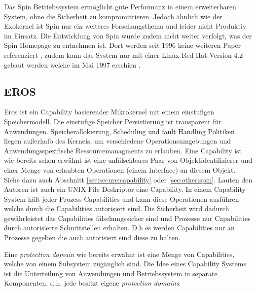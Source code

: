 \documentclass[11pt,technote]{IEEEtran}
\begin{document}
      Das Spin Betriebssystem erm\"oglicht gute Performanz in einem erweiterbaren System, ohne die Sicherheit zu kompromittieren.
      Jedoch \"ahnlich wie der Exokernel ist Spin nur ein weiteres Forschungsthema und leider nicht Produktiv im Einsatz.
      Die Entwicklung von Spin wurde zudem nicht weiter verfolgt, was der Spin Homepage zu entnehmen ist.
      Dort werden seit 1996 keine weiteren Paper referenziert \cite{Url:spin:papers}, zudem kann das System nur mit einer Linux Red Hat Version 4.2 
      gebaut werden welche im Mai 1997 erschien \cite{Url:spin:distro}.
      
    \subsection{EROS}      
      Eros ist ein Capability basierender Mikrokernel mit einem einstufigen Speichermodell. 
      Die einstufige Speicher Persistierung ist transparent f\"ur Anwendungen. Speicherallokierung, Scheduling und fault Handling Politiken 
      liegen au\ss erhalb des Kernels, um verschiedene Operationsumgebungen und Anwendungsspezifische Ressourcemanagments zu erlauben.
      Eine Capability ist wie bereits schon erw\"ahnt ist eine unf\"alschbares Paar von Objektidentifizierer und einer Menge von erlaubten Operationen
      (einem Interface) an diesem Objekt. Siehe dazu auch Abschnitt \ref{sec:secure:capability} oder \ref{sec:other:spin}.
      Lauten den Autoren ist auch ein UNIX File Deskriptor eine Capability. In einem Capability System
      h\"alt jeder Prozess Capabilities und kann diese Operationen ausf\"uhren welche durch die Capabilities autorisiert sind. 
      Die Sicherheit wird dadurch gew\"ahrleistet das Capabilities f\"alschungssicher sind und Prozesse nur Capabilities durch
      autorisierte Schnittstellen erhalten. D.h es werden Capabilities nur an Prozesse gegeben die auch autorisiert sind diese zu halten.
        
      Eine \textit{protection domain} wie bereits erw\"ahnt ist eine Menge von Capabilities, welche von einem Subsystem zug\"anglich sind.
      Die Idee eines Capability Systems ist die Unterteilung von Anwendungen und Betriebssystem in separate Komponenten, d.h. jede besitzt eigene
      \textit{protection domains}.
        
\end{document}
